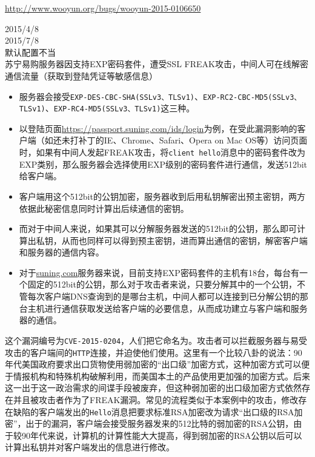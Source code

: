 \documentclass{leptc}
\begin{document}
\begin{center}
	\url{http://www.wooyun.org/bugs/wooyun-2015-0106650}
\end{center}
	 2015/4/8 \\
	 2015/7/8 \\
	 默认配置不当 \\
	 苏宁易购服务器因支持EXP密码套件，遭受SSL FREAK攻击，中间人可在线解密通信流量（获取到登陆凭证等敏感信息）
    \begin{itemize}
    	\item 服务器会接受\texttt{EXP-DES-CBC-SHA(SSLv3、TLSv1)}、\texttt{EXP-RC2-CBC-MD5(SSLv3、TLSv1)}、\texttt{EXP-RC4-MD5(SSLv3、TLSv1)}这三种。
    	\item 以登陆页面\url{https://passport.suning.com/ids/login}为例，在受此漏洞影响的客户端（如还未打补丁的IE、Chrome、Safari、Opera on Mac OS等）访问页面时，如果有中间人发起FREAK攻击，将\texttt{client hello}消息中的密码套件改为EXP类别，那么服务器会选择使用EXP级别的密码套件进行通信，发送512bit给客户端。
    	\item 客户端用这个512bit的公钥加密，服务器收到后用私钥解密出预主密钥，两方依据此秘密信息同时计算出后续通信的密钥。
    	\item 而对于中间人来说，如果其可以分解服务器发送的512bit的公钥，那么即可计算出私钥，从而也同样可以得到预主密钥，进而算出通信的密钥，解密客户端和服务器的通信内容。 
    	\item
    	对于\url{suning.com}服务器来说，目前支持EXP密码套件的主机有18台，每台有一个固定的512bit的公钥，那么对于攻击者来说，只要分解其中的一个公钥，不管每次客户端DNS查询到的是哪台主机，中间人都可以连接到已分解公钥的那台主机进行通信获取发送给客户端的必要信息，从而成功建立与客户端和服务器的通信。
    \end{itemize}
     这个漏洞编号为\texttt{CVE-2015-0204}，人们把它命名为。攻击者可以拦截服务器与易受攻击的客户端间的\texttt{HTTP}连接，并迫使他们使用。这里有一个比较八卦的说法：90年代美国政府要求出口货物使用弱加密的“出口级”加密方式，这种加密方式可以便于情报机构和特殊机构破解利用，而美国本土的产品使用更加强的加密方式。后来这一出于这一政治需求的间谍手段被废弃，但这种弱加密的出口级加密方式依然存在并且被攻击者作为了FREAK漏洞。常见的流程类似于本案例中的攻击，修改存在缺陷的客户端发出的\texttt{Hello}消息把要求标准RSA加密改为请求“出口级的RSA加密”，出于的漏洞，客户端会接受服务器发来的512比特的弱加密的RSA公钥，由于较90年代来说，计算机的计算性能大大提高，得到弱加密的RSA公钥以后可以计算出私钥并对客户端发出的信息进行修改。\\
\end{document}
